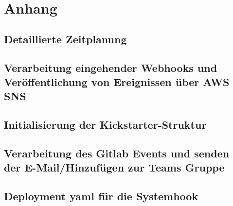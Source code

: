 \section{Anhang}
\subsection{Detaillierte Zeitplanung}
\label{app:Zeitplanung}

\clearpage


\clearpage

\clearpage

\clearpage

\clearpage

\clearpage

\clearpage


\clearpage

\subsection{Verarbeitung eingehender Webhooks und Veröffentlichung von Ereignissen über AWS SNS}
\label{app:CNMI}

\clearpage

\subsection{Initialisierung der Kickstarter-Struktur}
\label{app:kickStruct}

\clearpage

\subsection{Verarbeitung des Gitlab Events und senden der E-Mail/Hinzufügen zur Teams Gruppe}
\label{app:kickMain}

\clearpage

\subsection{Deployment yaml für die Systemhook}
\label{app:yamlFile}

\clearpage

